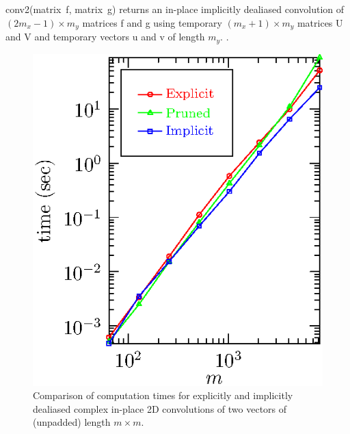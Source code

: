 \documentclass[final]{siamltex}
\begin{document}
\begin{function}[htbp]
  \Return \xf\;
\caption{conv2(matrix~{\sf f}, matrix~{\sf g}) 
returns an in-place implicitly dealiased convolution of $(2m_x-1)\times
m_y$ matrices {\sf f} and {\sf g} using temporary $(m_x+1)\times m_y$ matrices 
{\sf U} and {\sf V} and temporary vectors {\sf u} and {\sf v} of length $m_y$.
.}\label{conv2}
\end{function}

\begin{figure}[htbp]
\begin{center}
\begin{minipage}{0.49\linewidth}
\begin{center}
\includegraphics{timing2c}
\caption{Comparison of computation times for explicitly and implicitly
dealiased complex in-place 2D convolutions of two vectors of
(unpadded) length $m\times m$.}

\end{center}
\end{minipage}
\end{center}
\end{figure}
\end{document}
